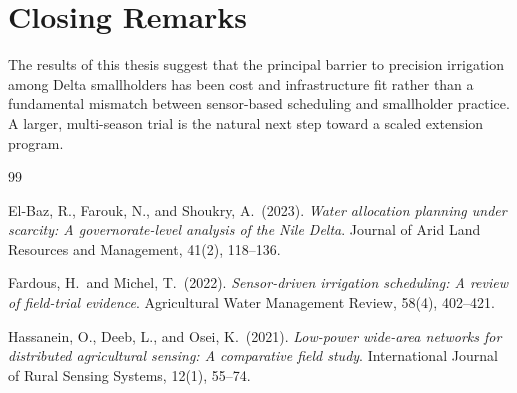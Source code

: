 \section{Closing Remarks}
The results of this thesis suggest that the principal barrier to precision irrigation among
Delta smallholders has been cost and infrastructure fit rather than a fundamental mismatch
between sensor-based scheduling and smallholder practice. A larger, multi-season trial is the
natural next step toward a scaled extension program.

\newpage
\begin{thebibliography}{99}

El-Baz, R., Farouk, N., and Shoukry, A.\ (2023).
\textit{Water allocation planning under scarcity: A governorate-level analysis of the Nile
Delta}. Journal of Arid Land Resources and Management, 41(2), 118--136.

Fardous, H.\ and Michel, T.\ (2022).
\textit{Sensor-driven irrigation scheduling: A review of field-trial evidence}. Agricultural
Water Management Review, 58(4), 402--421.

Hassanein, O., Deeb, L., and Osei, K.\ (2021).
\textit{Low-power wide-area networks for distributed agricultural sensing: A comparative
field study}. International Journal of Rural Sensing Systems, 12(1), 55--74.

\end{thebibliography}

\appendix
